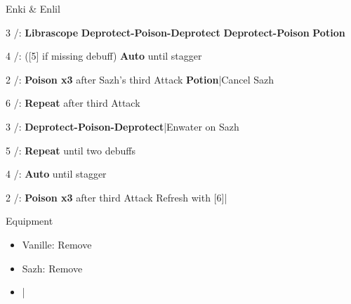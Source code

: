 \begin{fight}{Enki \& Enlil}
	\item [3] \sab/\syn: \textbf{Librascope} \to \textbf{Deprotect-Poison-Deprotect} \to \textbf{Deprotect-Poison} \to \textbf{Potion}
	\item [4] \rav/\rav: ([5] if missing debuff) \textbf{Auto} until stagger
	\item [2] \sab/\com: \textbf{Poison x3} after Sazh's third Attack \to \textbf{\textbf{Potion}}|Cancel Sazh
	\item [6] \sab/\com: \textbf{Repeat} after third Attack
	\item [3] \sab/\syn: \textbf{Deprotect-Poison-Deprotect}|Enwater on Sazh
	\item [5] \sab/\rav: \textbf{Repeat} until two debuffs
	\item [4] \rav/\rav: \textbf{Auto} until stagger
	\item [2] \sab/\com: \textbf{Poison x3} after third Attack \to Refresh with [6]|\skip
\end{fight}
\begin{menu}
	\item Equipment
	\begin{itemize}
		\item Vanille: Remove
		\item Sazh: Remove
	\end{itemize}
\end{menu}
\begin{itemize}
	\item \skip|\save
\end{itemize}
